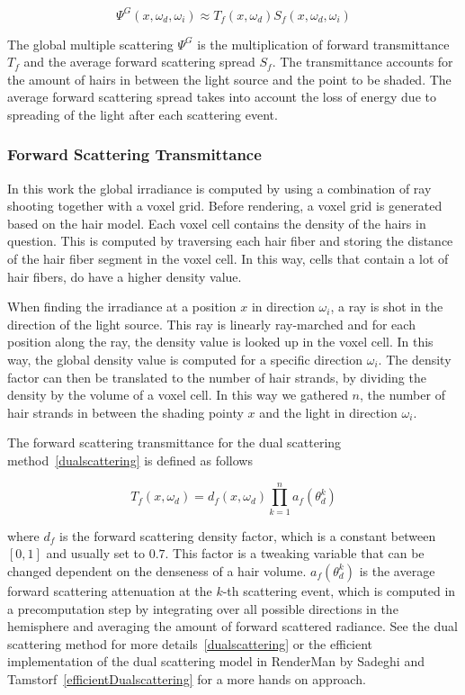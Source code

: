 \begin{equation}
\Psi^G(x, \omega_d, \omega_i) \approx T_f(x, \omega_d) S_f(x, \omega_d, \omega_i)
\end{equation}

The global multiple scattering $\Psi^G$ is the multiplication of forward transmittance $T_f$ and the average forward scattering spread $S_f$. The transmittance accounts for the amount of hairs in between the light source and the point to be shaded. The average forward scattering spread takes into account the loss of energy due to spreading of the light after each scattering event.

\subsubsection{Forward Scattering Transmittance}

In this work the global irradiance is computed by using a combination of ray shooting together with a voxel grid. Before rendering, a voxel grid is generated based on the hair model. Each voxel cell contains the density of the hairs in question. This is computed by traversing each hair fiber and storing the distance of the hair fiber segment in the voxel cell. In this way, cells that contain a lot of hair fibers, do have a higher density value.

When finding the irradiance at a position $x$ in direction $\omega_i$, a ray is shot in the direction of the light source. This ray is linearly ray-marched and for each position along the ray, the density value is looked up in the voxel cell. In this way, the global density value is computed for a specific direction $\omega_i$. The density factor can then be translated to the number of hair strands, by dividing the density by the volume of a voxel cell. In this way we gathered $n$, the number of hair strands in between the shading pointy $x$ and the light in direction $\omega_i$.

The forward scattering transmittance for the dual scattering method~\ref{dualscattering} is defined as follows

\begin{equation}
T_f(x, \omega_d) = d_f(x, \omega_d) \prod_{k=1}^{n} a_f(\theta_d^k)
\label{forwardscattering}
\end{equation}

where $d_f$ is the forward scattering density factor, which is a constant between $[0, 1]$ and usually set to $0.7$. This factor is a tweaking variable that can be changed dependent on the denseness of a hair volume.
$a_f(\theta_d^k)$ is the average forward scattering attenuation at the $k$-th scattering event, which is computed in a precomputation step by integrating over all possible directions in the hemisphere and averaging the amount of forward scattered radiance. See the dual scattering method for more details~\ref{dualscattering} or the efficient implementation of the dual scattering model in RenderMan by Sadeghi and Tamstorf~\ref{efficientDualscattering} for a more hands on approach.

